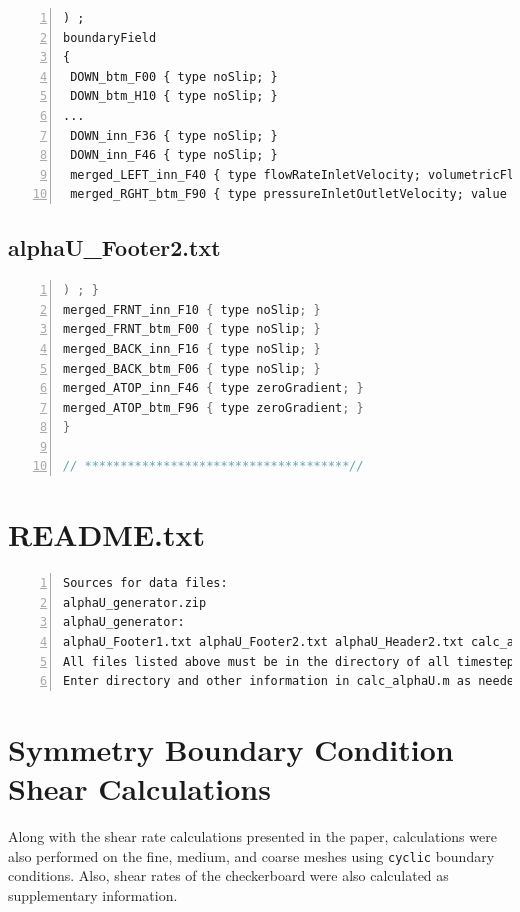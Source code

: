 \begin{lstlisting}[language={[GNU]C++},numbers=left,breaklines=true]
) ; 
boundaryField 
{  
 DOWN_btm_F00 { type noSlip; } 
 DOWN_btm_H10 { type noSlip; } 
...        
 DOWN_inn_F36 { type noSlip; }
 DOWN_inn_F46 { type noSlip; }
 merged_LEFT_inn_F40 { type flowRateInletVelocity; volumetricFlowRate constant 0.0075; extrapolateProfile false; value uniform (0.3197619 -0 -0); }
 merged_RGHT_btm_F90 { type pressureInletOutletVelocity; value nonuniform List<vector> 10500 ( 
\end{lstlisting}


\subsection*{alphaU\_Footer2.txt}

\begin{lstlisting}[language={C++},numbers=left,breaklines=true]
) ; }
merged_FRNT_inn_F10 { type noSlip; }
merged_FRNT_btm_F00 { type noSlip; }
merged_BACK_inn_F16 { type noSlip; }
merged_BACK_btm_F06 { type noSlip; }
merged_ATOP_inn_F46 { type zeroGradient; }
merged_ATOP_btm_F96 { type zeroGradient; }
}

// *************************************//
\end{lstlisting}


\section*{README.txt}

\begin{lstlisting}[numbers=left,breaklines=true]
Sources for data files:
alphaU_generator.zip
alphaU_generator:
alphaU_Footer1.txt alphaU_Footer2.txt alphaU_Header2.txt calc_alphaU.m README.txt 
All files listed above must be in the directory of all timestep folders for calc_alphaU.m to run properly. 
Enter directory and other information in calc_alphaU.m as needed to match information of the desired run.
\end{lstlisting}


\section{Symmetry Boundary Condition Shear Calculations}

Along with the shear rate calculations presented in the paper, calculations
were also performed on the fine, medium, and coarse meshes using \texttt{cyclic}
boundary conditions. Also, shear rates of the checkerboard were also
calculated as supplementary information.


